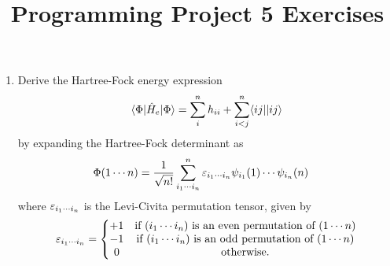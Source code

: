 \documentclass[fleqn,11pt]{article}
\title{Programming Project 5 Exercises}
\author{}
\date{}
\begin{document}
\maketitle

\begin{enumerate}
  \item Derive the Hartree-Fock energy expression
\begin{align}
  \langle\Phi|\hat{H}_e|\Phi\rangle
=
  \sum_i^n
  h_{ii}
+
  \sum_{i<j}^n
  \langle ij||ij\rangle
\end{align}
by expanding the Hartree-Fock determinant as
\begin{align}
&
  \Phi(1\cdots n)
=
  \dfrac{1}{\sqrt{n!}}
  \sum_{i_1\cdots i_n}^n
  \varepsilon_{i_1\cdots i_n}
  \psi_{i_1}(1)\cdots\psi_{i_n}(n)
\end{align}
where $\varepsilon_{i_1\cdots i_n}$ is the Levi-Civita permutation tensor, given by
\begin{align}
  \varepsilon_{i_1\cdots i_n}
=
  \left\{\begin{matrix}
    +1&\text{if $(i_1\cdots i_n)$ is an even permutation of $(1\cdots n)$}\\
    -1&\text{if $(i_1\cdots i_n)$ is an odd permutation of $(1\cdots n)$}\\
    0&\text{otherwise.}
  \end{matrix}\right.
\end{align}


\end{enumerate}
\end{document}
